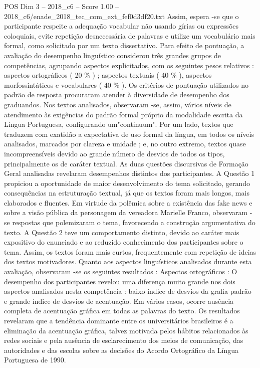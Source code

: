 \begin{textsample}{POS Dim 3 – 2018\_c6 – Score 1.00 – 2018\_c6/enade\_2018\_tec\_com\_ext\_fef0d3df20.txt}
Assim, espera -se que o participante respeite a adequação vocabular não usando gírias ou expressões coloquiais, evite repetição desnecessária de palavras e utilize um vocabulário mais formal, como solicitado por um texto dissertativo.
Para efeito de pontuação, a avaliação do desempenho linguístico considerou três grandes grupos de competências, agrupando aspectos explicitados, com os seguintes pesos relativos : aspectos ortográficos ( 20 \% ) ; aspectos textuais ( 40 \% ), aspectos morfossintáticos e vocabulares ( 40 \% ).
Os critérios de pontuação utilizados no padrão de resposta procuraram atender à diversidade de desempenho dos graduandos.
Nos textos analisados, observaram -se, assim, vários níveis de atendimento às exigências do padrão formal próprio da modalidade escrita da Língua Portuguesa, configurando um"continuum".
Por um lado, textos que traduzem com exatidão a expectativa de uso formal da língua, em todos os níveis analisados, marcados por clareza e unidade ; e, no outro extremo, textos quase incompreensíveis devido ao grande número de desvios de todos os tipos, principalmente os de caráter textual.
As duas questões discursivas de Formação Geral analisadas revelaram desempenhos distintos dos participantes.
A Questão 1 propiciou a oportunidade de maior desenvolvimento do tema solicitado, gerando consequências na estruturação textual, já que os textos foram mais longos, mais elaborados e fluentes.
Em virtude da polêmica sobre a existência das fake news e sobre a visão pública da personagem da vereadora Marielle Franco, observaram -se respostas que polemizaram o tema, favorecendo a construção argumentativa do texto.
A Questão 2 teve um comportamento distinto, devido ao caráter mais expositivo do enunciado e ao reduzido conhecimento dos participantes sobre o tema.
Assim, os textos foram mais curtos, frequentemente com repetição de ideias dos textos motivadores.
Quanto aos aspectos linguísticos analisados durante esta avaliação, observaram -se os seguintes resultados : Aspectos ortográficos : O desempenho dos participantes revelou uma diferença muito grande nos dois aspectos analisados nesta competência : baixo índice de desvios da grafia padrão e grande índice de desvios de acentuação.
Em vários casos, ocorre ausência completa de acentuação gráfica em todas as palavras do texto.
Os resultados revelaram que a tendência dominante entre os universitários brasileiros é a eliminação da acentuação gráfica, talvez motivada pelos hábitos relacionados às redes sociais e pela ausência de esclarecimento dos meios de comunicação, das autoridades e das escolas sobre as decisões do Acordo Ortográfico da Língua Portuguesa de 1990.

\end{textsample}
